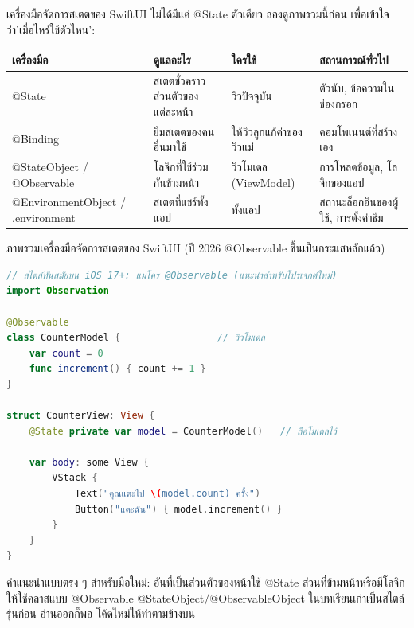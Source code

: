 


เครื่องมือจัดการสเตตของ SwiftUI ไม่ได้มีแค่ @State ตัวเดียว ลองดูภาพรวมนี้ก่อน เพื่อเข้าใจว่า'เมื่อไหร่ใช้ตัวไหน':

\begin{center}
\begin{tabularx}{\linewidth}{|X|X|X|X|}
\hline
\textbf{เครื่องมือ} & \textbf{ดูแลอะไร} & \textbf{ใครใช้} & \textbf{สถานการณ์ทั่วไป} \tabularnewline
\hline
@State & สเตตชั่วคราวส่วนตัวของแต่ละหน้า & วิวปัจจุบัน & ตัวนับ, ข้อความในช่องกรอก \tabularnewline
@Binding & ยืมสเตตของคนอื่นมาใช้ & ให้วิวลูกแก้ค่าของวิวแม่ & คอมโพเนนต์ที่สร้างเอง \tabularnewline
@StateObject / @Observable & โลจิกที่ใช้ร่วมกันข้ามหน้า & วิวโมเดล (ViewModel) & การโหลดข้อมูล, โลจิกของแอป \tabularnewline
@EnvironmentObject / .environment & สเตตที่แชร์ทั้งแอป & ทั้งแอป & สถานะล็อกอินของผู้ใช้, การตั้งค่าธีม \tabularnewline
\hline
\end{tabularx}
\end{center}

\begin{center}\small\color{gray}ภาพรวมเครื่องมือจัดการสเตตของ SwiftUI (ปี 2026 @Observable ขึ้นเป็นกระแสหลักแล้ว)\end{center}

\begin{lstlisting}[language=Swift]
// สไตล์ทันสมัยบน iOS 17+: แมโคร @Observable (แนะนำสำหรับโปรเจกต์ใหม่)
import Observation

@Observable
class CounterModel {                 // วิวโมเดล
    var count = 0
    func increment() { count += 1 }
}

struct CounterView: View {
    @State private var model = CounterModel()   // ถือโมเดลไว้

    var body: some View {
        VStack {
            Text("คุณแตะไป \(model.count) ครั้ง")
            Button("แตะฉัน") { model.increment() }
        }
    }
}
\end{lstlisting}

คำแนะนำแบบตรง ๆ สำหรับมือใหม่: อันที่เป็นส่วนตัวของหน้าใช้ @State ส่วนที่ข้ามหน้าหรือมีโลจิกให้ใช้คลาสแบบ @Observable @StateObject/@ObservableObject ในบทเรียนเก่าเป็นสไตล์รุ่นก่อน อ่านออกก็พอ โค้ดใหม่ให้ทำตามข้างบน

